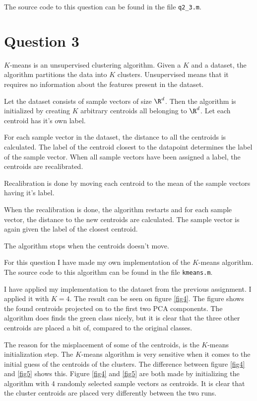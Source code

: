 \documentclass[10pt]{article}
\begin{document}
The source code to this question can be found in the file \texttt{q2\_3.m}.


\section*{Question 3} %
\label{sec:question_3}
$K$-means is an unsupervised clustering algorithm. Given a $K$ and a dataset, the algorithm partitions the data into $K$ clusters. Unsupervised means that it requires no information about the features present in the dataset.

Let the dataset consists of sample vectors of size $\R^d$. Then the algorithm is initialized by creating $K$ arbitrary centroids all belonging to $\R^d$. Let each centroid has it's own label. 

For each sample vector in the dataset, the distance to all the centroids is calculated. The label of the centroid closest to the datapoint determines the label of the sample vector. When all sample vectors have been assigned a label, the centroids are recalibrated. 

Recalibration is done by moving each centroid to the mean of the sample vectors having it's label. 

When the recalibration is done, the algorithm restarts and for each sample vector, the distance to the new centroids are calculated. The sample vector is again given the label of the closest centroid.

The algorithm stops when the centroids doesn't move.

For this question I have made my own implementation of the $K$-means algorithm. The source code to this algorithm can be found in the file \texttt{kmeans.m}. 

I have applied my implementation to the dataset from the previous assignment. I applied it with $K=4$. The result can be seen on figure \ref{fig4}. The figure shows the found centroids projected on to the first two PCA components. The algorithm does finds the green class nicely, but it is clear that the three other centroids are placed a bit of, compared to the original classes. 

The reason for the misplacement of some of the centroids, is the $K$-means initialization step. The $K$-means algorithm is very sensitive when it comes to the initial guess of the centroids of the clusters. The difference between figure \ref{fig4} and \ref{fig5} shows this. Figure \ref{fig4} and \ref{fig5} are both made by initializing the algorithm with 4 randomly selected sample vectors as centroids. It is clear that the cluster centroids are placed very differently between the two runs.
\end{document}
